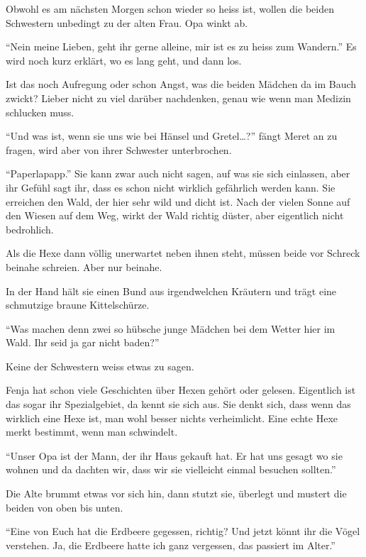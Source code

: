 \begin{center}
    {\color{red}\aldineleft}
\end{center}

Obwohl es am nächsten Morgen schon wieder so heiss ist, wollen die beiden Schwestern unbedingt zu der alten Frau. Opa winkt ab.

\enquote{Nein meine Lieben, geht ihr gerne alleine, mir ist es zu heiss zum Wandern.} Es wird noch kurz erklärt, wo es lang geht, und dann los.

Ist das noch Aufregung oder schon Angst, was die beiden Mädchen da im Bauch zwickt? Lieber nicht zu viel darüber nachdenken, genau wie wenn man Medizin schlucken muss. 

\enquote{Und was ist, wenn sie uns wie bei Hänsel und Gretel\dots?} fängt Meret an zu fragen, wird aber von ihrer Schwester unterbrochen.

\enquote{Paperlapapp.} Sie kann zwar auch nicht sagen, auf was sie sich einlassen, aber ihr Gefühl sagt ihr, dass es schon nicht wirklich gefährlich werden kann. Sie erreichen den Wald, der hier sehr wild und dicht ist. Nach der vielen Sonne auf den Wiesen auf dem Weg, wirkt der Wald richtig düster, aber eigentlich nicht bedrohlich.

Als die Hexe dann völlig unerwartet neben ihnen steht, müssen beide vor Schreck beinahe schreien. Aber nur beinahe. 

In der Hand hält sie einen Bund aus irgendwelchen Kräutern und trägt eine schmutzige braune Kittelschürze.

\enquote{Was machen denn zwei so hübsche junge Mädchen bei dem Wetter hier im Wald. Ihr seid ja gar nicht baden?}

Keine der Schwestern weiss etwas zu sagen.

Fenja hat schon viele Geschichten über Hexen gehört oder gelesen. Eigentlich ist das sogar ihr Spezialgebiet, da kennt sie sich aus. Sie denkt sich, dass wenn das wirklich eine Hexe ist, man wohl besser nichts verheimlicht. Eine echte Hexe merkt bestimmt, wenn man schwindelt.

\enquote{Unser Opa ist der Mann, der ihr Haus gekauft hat. Er hat uns gesagt wo sie wohnen und da dachten wir, dass wir sie vielleicht einmal besuchen sollten.}

Die Alte brummt etwas vor sich hin, dann stutzt sie, überlegt und mustert die beiden von oben bis unten.

\enquote{Eine von Euch hat die Erdbeere gegessen, richtig? Und jetzt könnt ihr die Vögel verstehen. Ja, die Erdbeere hatte ich ganz vergessen, das passiert im Alter.}

